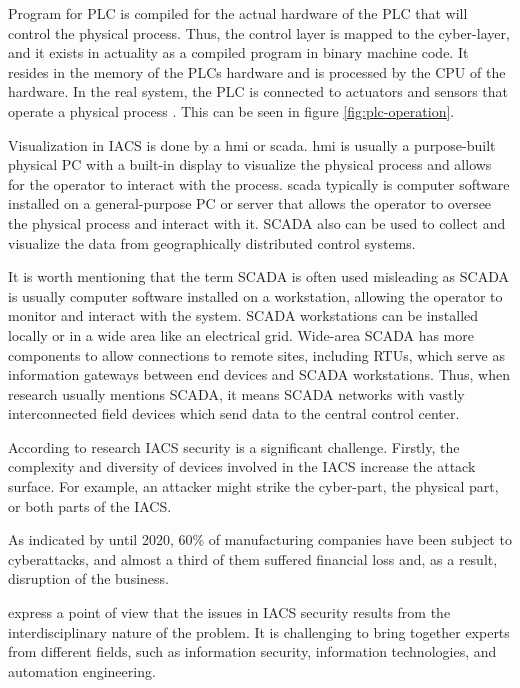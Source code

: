 Program for PLC is compiled for the actual hardware of the PLC that will control the physical process. Thus, the control layer is mapped to the cyber-layer, and it exists in actuality as a compiled program in binary machine code. It resides in the memory of the PLCs hardware and is processed by the CPU of the hardware. In the real system, the PLC is connected to actuators and sensors that operate a physical process \parencite{WEB-04-plc-vendors}. This can be seen in figure \ref{fig:plc-operation}.

Visualization in IACS is done by a \gls*{hmi} or \gls*{scada}. \gls*{hmi} is usually a purpose-built physical PC with a built-in display to visualize the physical process and allows for the operator to interact with the process. \gls*{scada} typically is computer software installed on a general-purpose PC or server that allows the operator to oversee the physical process and interact with it. SCADA also can be used to collect and visualize the data from geographically distributed control systems.

It is worth mentioning that the term SCADA is often used misleading as SCADA is usually computer software installed on a workstation, allowing the operator to monitor and interact with the system. SCADA workstations can be installed locally or in a wide area like an electrical grid. Wide-area SCADA has more components to allow connections to remote sites, including RTUs, which serve as information gateways between end devices and SCADA workstations. Thus, when research usually mentions SCADA, it means SCADA networks with vastly interconnected field devices which send data to the central control center.

According to research \parencite{48-red-tee-ics-testbed} IACS security is a significant challenge. Firstly, the complexity and diversity of devices involved in the IACS increase the attack surface. For example, an attacker might strike the cyber-part, the physical part, or both parts of the IACS.

As indicated by \citeauthor{29-ICS-cyber-range-scenarios} \parencite{29-ICS-cyber-range-scenarios} 
until 2020, 60\% of manufacturing companies have been subject to cyberattacks, and almost a third of them suffered financial loss and, as a result, disruption of the business.

\citeauthor{48-red-tee-ics-testbed} \parencite{48-red-tee-ics-testbed} express a point of view that the issues in IACS security results from the interdisciplinary nature of the problem. It is challenging to bring together experts from different fields, such as information security, information technologies, and automation engineering.

